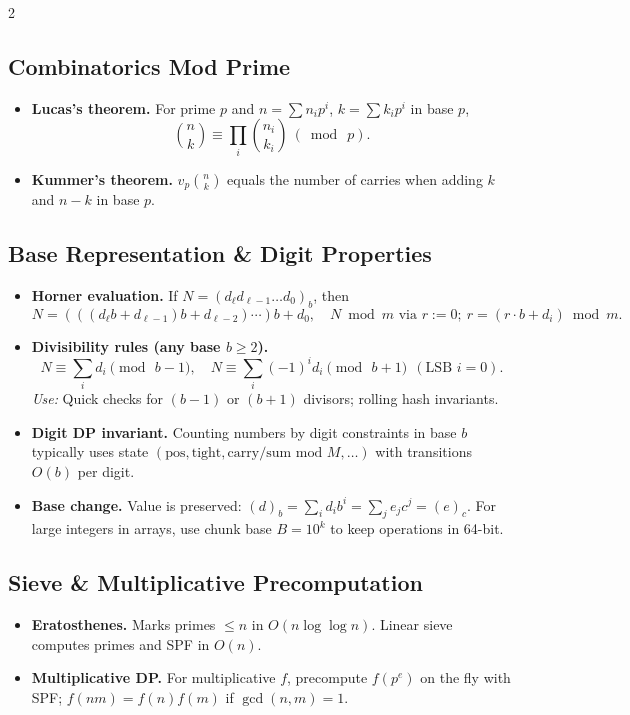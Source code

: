 \documentclass[10pt]{article}
\theoremstyle{definition}
\begin{document}
\begin{multicols*}{2}
\subsection{Combinatorics Mod Prime}
\begin{itemize}
  \item \textbf{Lucas's theorem.} For prime $p$ and $n=\sum n_i p^i$, $k=\sum k_i p^i$ in base $p$,
  \[
    \binom{n}{k}\equiv \prod_i \binom{n_i}{k_i}\ (\bmod\ p).
  \]
  \item \textbf{Kummer's theorem.} $v_p\!\binom{n}{k}$ equals the number of carries when adding $k$ and $n-k$ in base $p$.
\end{itemize}

\subsection{Base Representation \& Digit Properties}
\begin{itemize}
  \item \textbf{Horner evaluation.} If $N=(d_\ell d_{\ell-1}\dots d_0)_b$, then
  \[
    N = (((d_\ell b + d_{\ell-1})b + d_{\ell-2})\cdots)b + d_0, \quad
    N \bmod m \text{ via } r:=0;\ r=(r\cdot b + d_i)\bmod m.
  \]
  \item \textbf{Divisibility rules (any base $b\ge 2$).}
  \[
    N \equiv \sum_i d_i \pmod{\,b-1},\quad
    N \equiv \sum_i (-1)^i d_i \pmod{\,b+1}\ \ (\text{LSB }i=0).
  \]
  \emph{Use:} Quick checks for $(b-1)$ or $(b+1)$ divisors; rolling hash invariants.
  \item \textbf{Digit DP invariant.} Counting numbers by digit constraints in base $b$ typically uses state $(\text{pos},\text{tight},\text{carry/sum mod }M,\dots)$ with transitions $O(b)$ per digit.
  \item \textbf{Base change.} Value is preserved: $(d)_b=\sum_i d_i b^i=\sum_j e_j c^j = (e)_c$. For large integers in arrays, use chunk base $B=10^k$ to keep operations in 64-bit.
\end{itemize}

\subsection{Sieve \& Multiplicative Precomputation}
\begin{itemize}
  \item \textbf{Eratosthenes.} Marks primes $\le n$ in $O(n\log\log n)$. Linear sieve computes primes and SPF in $O(n)$.
  \item \textbf{Multiplicative DP.} For multiplicative $f$, precompute $f(p^e)$ on the fly with SPF; $f(nm)=f(n)f(m)$ if $\gcd(n,m)=1$.
\end{itemize}


\end{multicols*}
\end{document}
